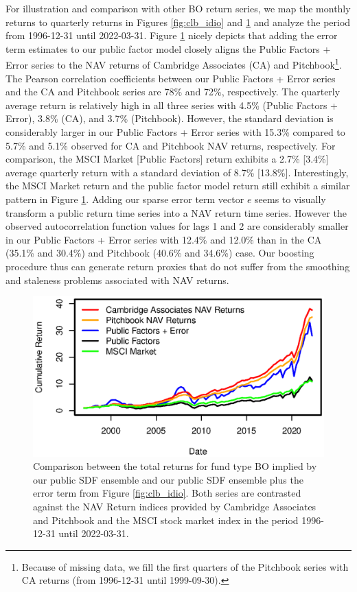 \documentclass[12pt]{article}
\begin{document}
For illustration and comparison with other BO return series, we map the monthly returns to quarterly returns in Figures \ref{fig:clb_idio} and \ref{fig:clb_total} and analyze the period from 1996-12-31 until 2022-03-31.
Figure \ref{fig:clb_total} nicely depicts that adding the error term estimates to our public factor model closely aligns the Public Factors + Error series to the NAV returns of Cambridge Associates (CA) and Pitchbook\footnote{Because of missing data, we fill the first quarters of the Pitchbook series with CA returns (from 1996-12-31 until 1999-09-30).}.
The Pearson correlation coefficients between our Public Factors + Error series and the CA and Pitchbook series are 78\% and 72\%, respectively.
The quarterly average return is relatively high in all three series with 4.5\% (Public Factors + Error), 3.8\% (CA), and 3.7\% (Pitchbook).
However, the standard deviation is considerably larger in our Public Factors + Error series with 15.3\% compared to 5.7\% and 5.1\% observed for CA and Pitchbook NAV returns, respectively.
For comparison, the MSCI Market [Public Factors] return exhibits a 2.7\% [3.4\%] average quarterly return with a standard deviation of 8.7\% [13.8\%].
Interestingly, the MSCI Market return and the public factor model return still exhibit a similar pattern in Figure \ref{fig:clb_total}.
Adding our sparse error term vector $e$ seems to visually transform a public return time series into a NAV return time series.
However the observed autocorrelation function values for lags 1 and 2 are considerably smaller in our Public Factors + Error series with 12.4\% and 12.0\% than in the CA (35.1\% and 30.4\%) and Pitchbook (40.6\% and 34.6\%) case.
Our boosting procedure thus can generate return proxies that do not suffer from the smoothing and staleness problems associated with NAV returns.

\begin{figure}[H]
	\centering
	\includegraphics{Figures/TotalErrorSeriesBO}
	\caption{
		Comparison between the total returns for fund type BO implied by our public SDF ensemble and our public SDF ensemble plus the error term from Figure \ref{fig:clb_idio}.
		Both series are contrasted against the NAV Return indices provided by Cambridge Associates and Pitchbook and the MSCI stock market index in the period 1996-12-31 until 2022-03-31.
		}
	\label{fig:clb_total}
\end{figure}
\end{document}
